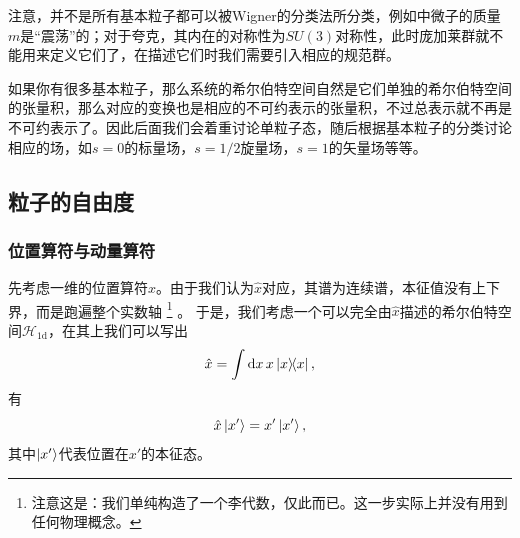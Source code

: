 注意，并不是所有基本粒子都可以被Wigner的分类法所分类，例如中微子的质量$m$是“震荡”的；对于夸克，其内在的对称性为$SU(3)$对称性，此时庞加莱群就不能用来定义它们了，在描述它们时我们需要引入相应的规范群。

如果你有很多基本粒子，那么系统的希尔伯特空间自然是它们单独的希尔伯特空间的张量积，那么对应的变换也是相应的不可约表示的张量积，不过总表示就不再是不可约表示了。因此后面我们会着重讨论单粒子态，随后根据基本粒子的分类讨论相应的场，如$s=0$的标量场，$s=1/2$旋量场，$s=1$的矢量场等等。



\subsection{粒子的自由度}\label{sec:single-particle-quantity}

\subsubsection{位置算符与动量算符}\label{sec:position-and-momentum}

先考虑一维的位置算符$\hat{x}$。由于我们认为$\hat{x}$对应，其谱为连续谱，本征值没有上下界，而是跑遍整个实数轴%
\footnote{注意这是：我们单纯构造了一个李代数，仅此而已。这一步实际上并没有用到任何物理概念。}%
。
于是，我们考虑一个可以完全由$\hat{x}$描述的希尔伯特空间$\mathcal{H}_{1\text{d}}$，在其上我们可以写出
\begin{equation}
    \hat{x} = \int \dd{x} x \dyad{x},
\end{equation}
有
\begin{equation}
    \hat{x} \ket{x'} = x' \ket{x'},
\end{equation}
其中$\ket{x'}$代表位置在$x'$的本征态。

